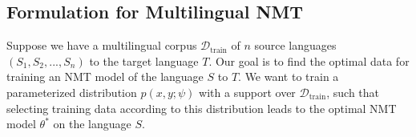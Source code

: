 \subsection{\label{sec:nmt_method}Formulation for Multilingual NMT}

Suppose we have a multilingual corpus $\mathcal{D}_{\text{train}}$ of $n$ source languages $(S_1, S_2, ..., S_n)$ to the target language $T$. Our goal is to find the optimal data for training an NMT model of the language $S$ to $T$. We want to train a parameterized distribution $p(x, y;\psi)$ with a support over $\mathcal{D}_{\text{train}}$, such that selecting training data according to this distribution leads to the optimal NMT model $\theta^*$ on the language $S$. 

